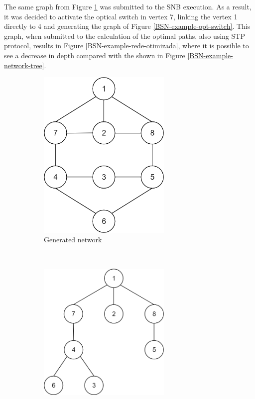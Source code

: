 \documentclass[conference]{IEEEtran}
\begin{document}
The same graph from Figure \ref{BSN-example-network} was submitted to the SNB execution. As a result, it was decided to activate the optical switch in vertex 7, linking the vertex 1 directly to 4 and generating the graph of Figure \ref{BSN-example-opt-switch}. This graph, when submitted to the calculation of the optimal paths, also using STP protocol, results in Figure \ref{BSN-example-rede-otimizada}, where it is possible to see a decrease in depth compared with the shown in Figure \ref{BSN-example-network-tree}.

\begin{figure}[t!]
	\centering
	\begin{subfigure}[t]{0.2\textwidth}
		\centering
		\includegraphics[width=0.7\textwidth]{./figuras/BSN-ex-network-generation.png} %
		\caption{Generated network}
		\label{BSN-example-network}
	\end{subfigure}%
	~
	\begin{subfigure}[t]{0.2\textwidth}
		\centering
		\includegraphics[width=0.7\textwidth]{./figuras/BSN-ex-network-generation-tree.png} %

\end{subfigure}
\end{figure}
\end{document}

